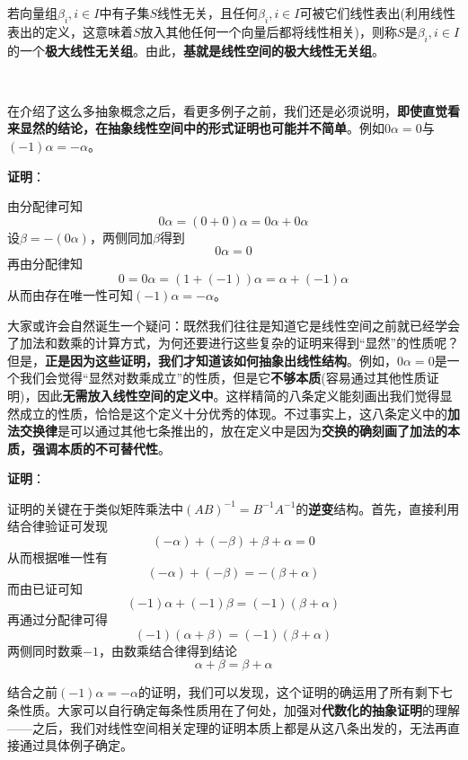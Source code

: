 \documentclass[a4paper,UTF8,fontset=windows,AutoFakeBold]{ctexart}
\newcommand*{\note}{\noindent *}
\newcommand{\proo}[1]{{\vspace{5pt}\kaishu\noindent\textbf{证明}：\vspace{-3pt}
\begin{compactitem}
    \item[] #1
\end{compactitem}
}}
\begin{document}
\note 若向量组$\beta_i,i\in I$中有子集$S$线性无关，且任何$\beta_i,i\in I$可被它们线性表出(利用线性表出的定义，这意味着$S$放入其他任何一个向量后都将线性相关)，则称$S$是$\beta_i,i\in I$的一个\textbf{极大线性无关组}。由此，\textbf{基就是线性空间的极大线性无关组}。

\

在介绍了这么多抽象概念之后，看更多例子之前，我们还是必须说明，\textbf{即使直觉看来显然的结论，在抽象线性空间中的形式证明也可能并不简单}。例如$0\alpha=0$与$(-1)\alpha=-\alpha$。

\proo{
    由分配律可知
    $$0\alpha=(0+0)\alpha=0\alpha+0\alpha$$
    设$\beta=-(0\alpha)$，两侧同加$\beta$得到
    $$0\alpha=0$$
    再由分配律知
    $$0=0\alpha=(1+(-1))\alpha=\alpha+(-1)\alpha$$
    从而由存在唯一性可知$(-1)\alpha=-\alpha$。
}

大家或许会自然诞生一个疑问：既然我们往往是知道它是线性空间之前就已经学会了加法和数乘的计算方式，为何还要进行这些复杂的证明来得到``显然''的性质呢？但是，\textbf{正是因为这些证明，我们才知道该如何抽象出线性结构}。例如，$0\alpha=0$是一个我们会觉得``显然对数乘成立''的性质，但是它\textbf{不够本质}(容易通过其他性质证明)，因此\textbf{无需放入线性空间的定义中}。这样精简的八条定义能刻画出我们觉得显然成立的性质，恰恰是这个定义十分优秀的体现。不过事实上，这八条定义中的\textbf{加法交换律}是可以通过其他七条推出的，放在定义中是因为\textbf{交换的确刻画了加法的本质，强调本质的不可替代性}。

\proo{
    证明的关键在于类似矩阵乘法中$(AB)^{-1}=B^{-1}A^{-1}$的\textbf{逆变}结构。首先，直接利用结合律验证可发现
    $$(-\alpha)+(-\beta)+\beta+\alpha=0$$
    从而根据唯一性有
    $$(-\alpha)+(-\beta)=-(\beta+\alpha)$$
    而由已证可知
    $$(-1)\alpha+(-1)\beta=(-1)(\beta+\alpha)$$
    再通过分配律可得
    $$(-1)(\alpha+\beta)=(-1)(\beta+\alpha)$$
    两侧同时数乘$-1$，由数乘结合律得到结论
    $$\alpha+\beta=\beta+\alpha$$
}

\note 结合之前$(-1)\alpha=-\alpha$的证明，我们可以发现，这个证明的确运用了所有剩下七条性质。大家可以自行确定每条性质用在了何处，加强对\textbf{代数化的抽象证明}的理解——之后，我们对线性空间相关定理的证明本质上都是从这八条出发的，无法再直接通过具体例子确定。

\
\end{document}
